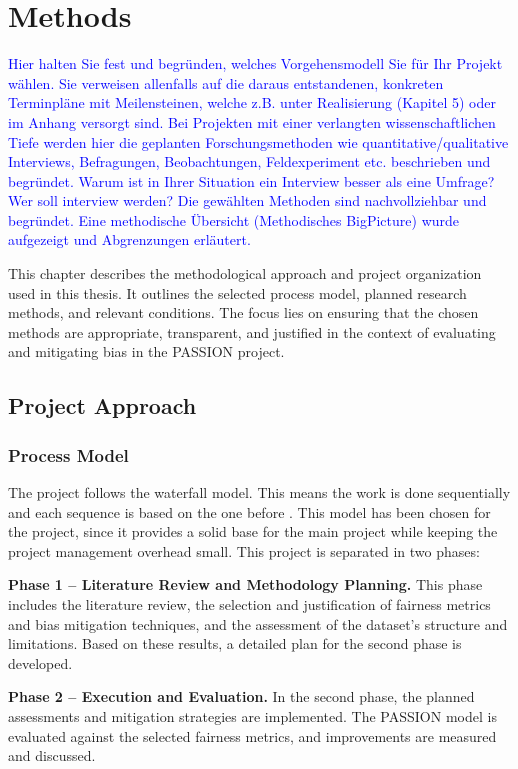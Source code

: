 \documentclass[12pt, a4paper, oneside]{book}   	%
\newcommand{\baaCriteria}[1]{\textcolor{blue}{#1}}
\begin{document}
	\chapter{Methods}\label{chap:methodology}
		\baaCriteria{Hier halten Sie fest und begründen, welches Vorgehensmodell Sie für Ihr Projekt wählen. Sie verweisen allenfalls auf die daraus entstandenen, konkreten Terminpläne mit Meilensteinen, welche z.B. unter Realisierung (Kapitel 5) oder im Anhang versorgt sind. Bei Projekten mit einer verlangten wissenschaftlichen Tiefe werden hier die geplanten Forschungsmethoden wie quantitative/qualitative Interviews, Befragungen, Beobachtungen, Feldexperiment etc. beschrieben und begründet. Warum ist in Ihrer Situation ein Interview besser als eine Umfrage? Wer soll interview werden?}
		\baaCriteria{Die gewählten Methoden sind nachvollziehbar und begründet. Eine methodische Übersicht (Methodisches BigPicture) wurde aufgezeigt und Abgrenzungen erläutert.}
		
		
		This chapter describes the methodological approach and project organization used in this thesis. It outlines the selected process model, planned research methods, and relevant conditions. The focus lies on ensuring that the chosen methods are appropriate, transparent, and justified in the context of evaluating and mitigating bias in the PASSION project.
		
		\section{Project Approach}
		\subsection{Process Model}
		The project follows the waterfall model. This means the work is done sequentially and each sequence is based on the one before \autocite{Petersen_2009}. This model has been chosen for the project, since it provides a solid base for the main project while keeping the project management overhead small.
		This project is separated in two phases:
		
		\textbf{Phase 1 – Literature Review and Methodology Planning.} This phase includes the literature review, the selection and justification of fairness metrics and bias mitigation techniques, and the assessment of the dataset's structure and limitations. Based on these results, a detailed plan for the second phase is developed.
		
		\textbf{Phase 2 – Execution and Evaluation.} In the second phase, the planned assessments and mitigation strategies are implemented. The PASSION model is evaluated against the selected fairness metrics, and improvements are measured and discussed.
		
\end{document}
